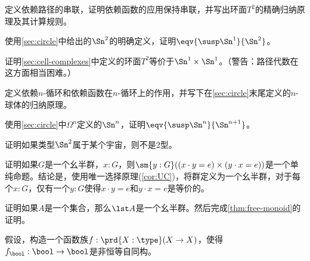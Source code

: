\sectionExercises

\begin{ex}\label{ex:torus}
定义依赖路径的串联，证明依赖函数的应用保持串联，并写出环面$T^2$的精确归纳原理及其计算规则。
\end{ex}

\begin{ex}\label{ex:suspS1}
使用\cref{sec:circle}中给出的$\Sn^2$的明确定义，证明$\eqv{\susp \Sn^1}{\Sn^2}$。
\end{ex}

\begin{ex}\label{ex:torus-s1-times-s1}
证明\cref{sec:cell-complexes}中定义的环面$T^2$等价于$\Sn^1\times \Sn^1$。（警告：路径代数在这方面相当困难。）
\end{ex}

\begin{ex}\label{ex:nspheres}
定义依赖$n$-循环和依赖函数在$n$-循环上的作用，并写下在\cref{sec:circle}末尾定义的$n$-球体的归纳原理。
\end{ex}

\begin{ex}\label{ex:susp-spheres-equiv}
使用\cref{sec:circle}中$\Omega^n$定义的$\Sn^n$，证明$\eqv{\susp \Sn^n}{\Sn^{n+1}}$。
\end{ex}

\begin{ex}\label{ex:spheres-make-U-not-2-type}
证明如果类型$\Sn^2$属于某个宇宙\type，则\type 不是2型。
\end{ex}

\begin{ex}\label{ex:monoid-eq-prop}
证明如果$G$是一个幺半群，$x:G$，则$\sm{y:G}((x\cdot y = e) \times (y\cdot x =e))$是一个单纯命题。结论是，使用唯一选择原理(\cref{cor:UC})，将群定义为一个幺半群，对于每个$x:G$，仅有一个$y:G$使得$x\cdot y = e$和$y\cdot x=e$是等价的。
\end{ex}

\begin{ex}\label{ex:free-monoid}
证明如果$A$是一个集合，那么$\lst A$是一个幺半群。然后完成\cref{thm:free-monoid}的证明。
\end{ex}

\begin{ex}\label{ex:unnatural-endomorphisms}
假设\LEM{}，构造一个函数族$f:\prd{X:\type}(X\to X)$，使得$f_\bool:\bool\to\bool$是非恒等自同构。
\end{ex}

